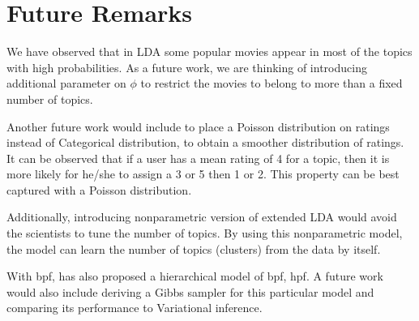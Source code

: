 \documentclass{article} %
\begin{document}
\section{Future Remarks}
We have observed that in LDA some popular movies appear in most of the topics with high probabilities. 
As a future work, we are thinking of introducing additional parameter on $\phi$ 
to restrict the movies to belong to more than a fixed number of topics. 

Another future work would include to place a Poisson distribution on ratings instead of 
Categorical distribution, to obtain a smoother distribution of ratings. It can 
be observed that if a user has a mean rating of 4 for a topic, then it is more 
likely for he/she to assign a 3 or 5 then 1 or 2. This property can be best 
captured with a Poisson distribution. 

Additionally, introducing nonparametric version of extended LDA would avoid the 
scientists to tune the number of topics. By using this nonparametric model, the 
model can learn the number of topics (clusters) from the data by itself. 

With \gls{bpf}, \cite{gopalan2013scalable} has also proposed a hierarchical 
model of \gls{bpf}, \gls{hpf}. A future work would also include deriving a Gibbs 
sampler for this particular model and comparing its performance to Variational 
inference. 



\end{document}
